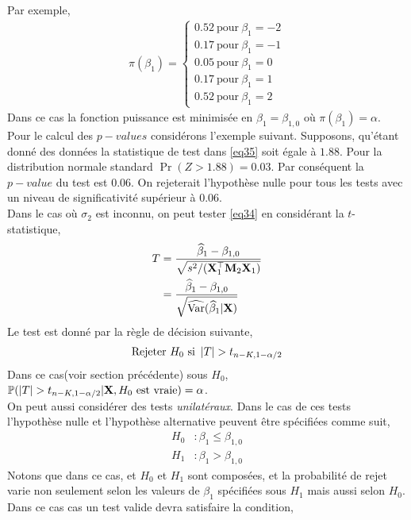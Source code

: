 Par exemple,
\begin{align*}
\pi(\beta_1) =
\left\{
\begin{array}{c}
0.52 \ \textrm{pour} \ \beta_1 = -2\\
0.17 \ \textrm{pour} \ \beta_1 = -1\\
0.05 \ \textrm{pour} \ \beta_1 = 0\\
0.17 \ \textrm{pour} \ \beta_1 = 1\\
0.52 \ \textrm{pour} \ \beta_1 = 2
\end{array}
\right.
\end{align*}
Dans ce cas la fonction puissance est minimisée en $\beta_1 = \beta_{1,0}$ où $\pi(\beta_1) = \alpha$.\\
Pour le calcul des $p-values$ considérons l'exemple suivant. Supposons, qu'étant donné des données la statistique de test  dans \eqref{eq35} soit égale à $1.88$. Pour la distribution normale standard $\Pr(Z > 1.88) = 0.03$. Par conséquent la $p-value$ du test est $0.06$. On rejeterait l'hypothèse nulle pour tous les tests avec un niveau de significativité supérieur à $0.06$.\\
Dans le cas où $\sigma_2$ est inconnu, on peut tester \eqref{eq34} en considérant la 
$t$-statistique,
\begin{align}
T &= \frac{\widehat{\beta}_1 - \beta_{1,0}}{\sqrt{s^2/(\mathbf{X}_1^\top\mathbf{M}_2\mathbf{X}_1)}}\nonumber\\
&=\frac{\widehat{\beta}_1 - \beta_{1,0}}{\sqrt{\widehat{\mathrm{Var}}(\widehat{\beta}_1 | \mathbf{X})}}
\label{eq37}
\end{align}
Le test est donné par la règle de décision suivante,
\begin{align*}
\textrm{Rejeter} \ H_0 \ \textrm{si} \ \left\vert {T} \right\vert > t_{n-K, 1-\alpha/2}
\end{align*}
Dans ce cas(voir section précédente) sous $H_0$, ${\mathbb{P}}( \left\vert {T} \right\vert > t_{n-K, 1-\alpha/2} | \mathbf{X}, H_0 \ \textrm{est vraie}) = \alpha$.\\
On peut aussi considérer des tests \emph{unilatéraux}. Dans le cas de ces tests l'hypothèse nulle et l'hypothèse alternative peuvent être spécifiées comme suit,
\begin{align*}
H_0 &:  \beta_1 \leq \beta_{1,0}\\
H_1 &:  \beta_1 > \beta_{1,0}
\end{align*}
Notons que dans ce cas, et $H_0$ et $H_1$ sont composées, et la probabilité de rejet varie non seulement selon les valeurs de $\beta_1$ spécifiées sous $H_1$ mais aussi selon $H_0$. Dans ce cas cas un test valide devra satisfaire la condition,
